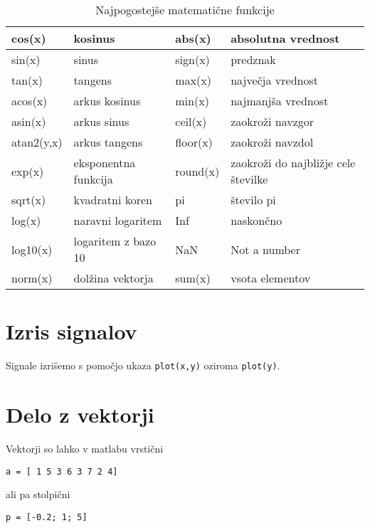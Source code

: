 \begin {table}[htb]
\caption{Najpogostejše matematične funkcije}
\vspace{0.5cm}
\begin{tabular}{|l|l|l|l|} \hline
cos(x)	& kosinus	& abs(x)	& absolutna vrednost \\ \hline
sin(x)	& sinus	& sign(x)	& predznak \\ \hline
tan(x)	& tangens	& max(x)	& največja vrednost \\ \hline
acos(x)	& arkus kosinus	& min(x)	& najmanjša vrednost \\ \hline
asin(x)	& arkus sinus	& ceil(x)	& zaokroži navzgor \\ \hline
atan2(y,x)	& arkus tangens	& floor(x)	& zaokroži navzdol \\ \hline
exp(x)	& eksponentna funkcija	& round(x)	& zaokroži do najbližje cele številke \\ \hline
sqrt(x)	& kvadratni koren	& pi	& število pi \\ \hline
log(x)	& naravni logaritem	& Inf	& naskončno \\ \hline
log10(x)	& logaritem z bazo 10	& NaN	& Not a number \\ \hline
norm(x)	& dolžina vektorja	& sum(x)	& vsota elementov \\ \hline

\end{tabular}
\end {table}

\section{Izris signalov}

Signale izrišemo s pomočjo ukaza \verb"plot(x,y)" oziroma \verb"plot(y)".

\section{Delo z vektorji}

Vektorji so lahko v matlabu vrstični
\vspace{-0.5cm}
\begin{lstlisting}
a = [ 1 5 3 6 3 7 2 4]
\end{lstlisting}
\vspace{0.2cm}

ali pa stolpični
\vspace{-0.5cm}
\begin{lstlisting}
p = [-0.2; 1; 5]
\end{lstlisting}
\vspace{0.2cm}

